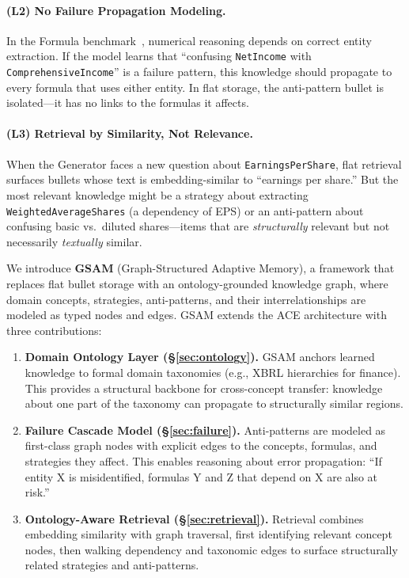 \documentclass[12pt,a4paper]{article}
\begin{document}
\paragraph{(L2) No Failure Propagation Modeling.} In the Formula benchmark~\cite{wang2025finlora}, numerical reasoning depends on correct entity extraction. If the model learns that ``confusing \texttt{NetIncome} with \texttt{ComprehensiveIncome}'' is a failure pattern, this knowledge should propagate to every formula that uses either entity. In flat storage, the anti-pattern bullet is isolated---it has no links to the formulas it affects.

\paragraph{(L3) Retrieval by Similarity, Not Relevance.} When the Generator faces a new question about \texttt{EarningsPerShare}, flat retrieval surfaces bullets whose text is embedding-similar to ``earnings per share.'' But the most relevant knowledge might be a strategy about extracting \texttt{WeightedAverageShares} (a dependency of EPS) or an anti-pattern about confusing basic vs.\ diluted shares---items that are \textit{structurally} relevant but not necessarily \textit{textually} similar.

We introduce \textbf{GSAM} (Graph-Structured Adaptive Memory), a framework that replaces flat bullet storage with an ontology-grounded knowledge graph, where domain concepts, strategies, anti-patterns, and their interrelationships are modeled as typed nodes and edges. GSAM extends the ACE architecture with three contributions:

\begin{enumerate}[leftmargin=*]
\item \textbf{Domain Ontology Layer (\S\ref{sec:ontology}).} GSAM anchors learned knowledge to formal domain taxonomies (e.g., XBRL hierarchies for finance). This provides a structural backbone for cross-concept transfer: knowledge about one part of the taxonomy can propagate to structurally similar regions.

\item \textbf{Failure Cascade Model (\S\ref{sec:failure}).} Anti-patterns are modeled as first-class graph nodes with explicit edges to the concepts, formulas, and strategies they affect. This enables reasoning about error propagation: ``If entity X is misidentified, formulas Y and Z that depend on X are also at risk.''

\item \textbf{Ontology-Aware Retrieval (\S\ref{sec:retrieval}).} Retrieval combines embedding similarity with graph traversal, first identifying relevant concept nodes, then walking dependency and taxonomic edges to surface structurally related strategies and anti-patterns.
\end{enumerate}
\end{document}
